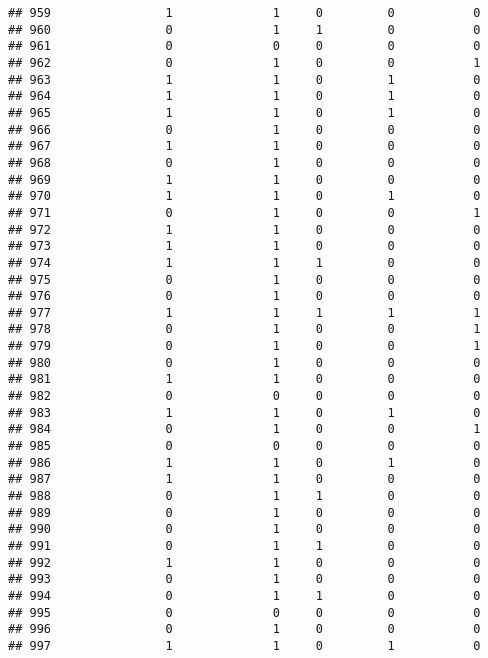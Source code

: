 \documentclass[]{article}
\begin{document}
\begin{verbatim}
## 959                1              1     0         0           0
## 960                0              1     1         0           0
## 961                0              0     0         0           0
## 962                0              1     0         0           1
## 963                1              1     0         1           0
## 964                1              1     0         1           0
## 965                1              1     0         1           0
## 966                0              1     0         0           0
## 967                1              1     0         0           0
## 968                0              1     0         0           0
## 969                1              1     0         0           0
## 970                1              1     0         1           0
## 971                0              1     0         0           1
## 972                1              1     0         0           0
## 973                1              1     0         0           0
## 974                1              1     1         0           0
## 975                0              1     0         0           0
## 976                0              1     0         0           0
## 977                1              1     1         1           1
## 978                0              1     0         0           1
## 979                0              1     0         0           1
## 980                0              1     0         0           0
## 981                1              1     0         0           0
## 982                0              0     0         0           0
## 983                1              1     0         1           0
## 984                0              1     0         0           1
## 985                0              0     0         0           0
## 986                1              1     0         1           0
## 987                1              1     0         0           0
## 988                0              1     1         0           0
## 989                0              1     0         0           0
## 990                0              1     0         0           0
## 991                0              1     1         0           0
## 992                1              1     0         0           0
## 993                0              1     0         0           0
## 994                0              1     1         0           0
## 995                0              0     0         0           0
## 996                0              1     0         0           0
## 997                1              1     0         1           0

\end{verbatim}
\end{document}
